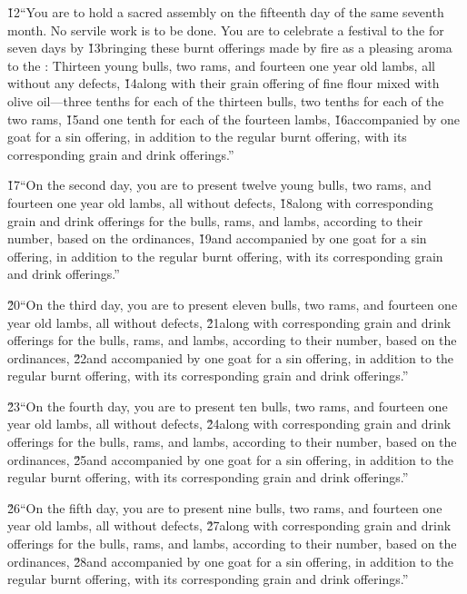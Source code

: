 \v{12}``You are to hold a sacred assembly on the fifteenth day of the same seventh month. No servile work is to be done. You are to celebrate a festival to the  for seven days by \v{13}bringing these burnt offerings made by fire as a pleasing aroma to the : Thirteen young bulls, two rams, and fourteen one year old lambs, all without any defects, \v{14}along with their grain offering of fine flour mixed with olive oil---three tenths for each of the thirteen bulls, two tenths for each of the two rams, \v{15}and one tenth for each of the fourteen lambs, \v{16}accompanied by one goat for a sin offering, in addition to the regular burnt offering, with its corresponding grain and drink offerings.''

\v{17}``On the second day, you are to present twelve young bulls, two rams, and fourteen one year old lambs, all without defects, \v{18}along with corresponding grain and drink offerings for the bulls, rams, and lambs, according to their number, based on the ordinances, \v{19}and accompanied by one goat for a sin offering, in addition to the regular burnt offering, with its corresponding grain and drink offerings.''

\v{20}``On the third day, you are to present eleven bulls, two rams, and fourteen one year old lambs, all without defects, \v{21}along with corresponding grain and drink offerings for the bulls, rams, and lambs, according to their number, based on the ordinances, \v{22}and accompanied by one goat for a sin offering, in addition to the regular burnt offering, with its corresponding grain and drink offerings.''

\v{23}``On the fourth day, you are to present ten bulls, two rams, and fourteen one year old lambs, all without defects, \v{24}along with corresponding grain and drink offerings for the bulls, rams, and lambs, according to their number, based on the ordinances, \v{25}and accompanied by one goat for a sin offering, in addition to the regular burnt offering, with its corresponding grain and drink offerings.''

\v{26}``On the fifth day, you are to present nine bulls, two rams, and fourteen one year old lambs, all without defects, \v{27}along with corresponding grain and drink offerings for the bulls, rams, and lambs, according to their number, based on the ordinances, \v{28}and accompanied by one goat for a sin offering, in addition to the regular burnt offering, with its corresponding grain and drink offerings.''


